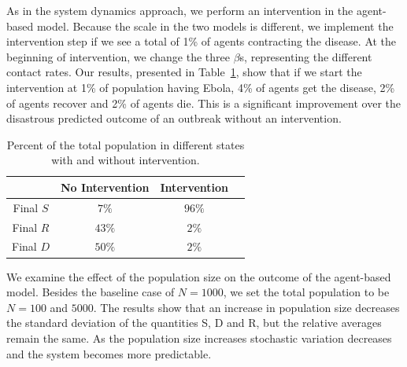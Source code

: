 As in the system dynamics approach, we perform an intervention in the agent-based model. Because the scale in the two models is different, we implement the intervention step if we see a total of 1\% of agents contracting the disease. At the beginning of intervention, we change the three $\beta$s, representing the different contact rates. Our results, presented in Table~\ref{tab:intervention}, show that if we start the intervention at 1\% of population having Ebola, 4\% of agents get the disease, 2\% of agents recover and 2\% of agents die. This is a significant improvement over the disastrous predicted outcome of an outbreak without an intervention. 



\begin{table}[h!]
\centering %
\begin{tabular}{c | c c c} 
\hline\hline %
&No Intervention & Intervention \\ %
\hline %

Final $S$ 	& $7\%$ & $96\%$	\\					
Final $R$ & $43\%$ & $2\%$\\
Final $D$ & $50\%$ & $2\%$\\\hline 
\end{tabular}
\caption{Percent of the total population in different states with and without intervention.}
\label{tab:intervention}
\end{table}

We examine the effect of the population size on the outcome of the agent-based model. Besides the baseline case of $N = 1000$, we set the total population to be $N = 100$ and $5000$. The results show that an increase in population size decreases the standard deviation of the quantities S, D and R, but the relative averages remain the same. As the population size increases stochastic variation decreases and the system becomes more predictable. 



